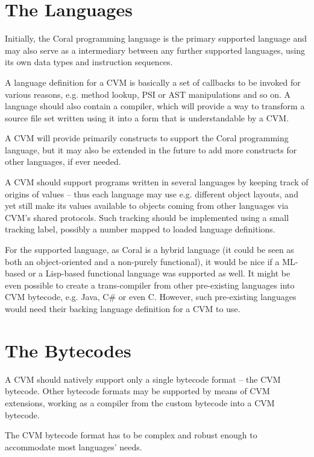 \section{The Languages}

Initially, the Coral programming language is the primary supported language and may also serve as a intermediary between any further supported languages, using its own data types and instruction sequences. 

A language definition for a CVM is basically a set of callbacks to be invoked for various reasons, e.g. method lookup, PSI or AST manipulations and so on. A language should also contain a compiler, which will provide a way to transform a source file set written using it into a form that is understandable by a CVM. 

A CVM will provide primarily constructs to support the Coral programming language, but it may also be extended in the future to add more constructs for other languages, if ever needed. 

A CVM should support programs written in several languages by keeping track of origins of values -- thus each language may use e.g. different object layouts, and yet still make its values available to objects coming from other languages via CVM's shared protocols. Such tracking should be implemented using a small tracking label, possibly a number mapped to loaded language definitions. 

For the supported language, as Coral is a hybrid language (it could be seen as both an object-oriented and a non-purely functional), it would be nice if a ML-based or a Lisp-based functional language was supported as well. It might be even possible to create a trans-compiler from other pre-existing languages into CVM bytecode, e.g. Java, C\# or even C. However, such pre-existing languages would need their backing language definition for a CVM to use. 





\section{The Bytecodes}

A CVM should natively support only a single bytecode format -- the CVM bytecode. Other bytecode formats may be supported by means of CVM extensions, working as a compiler from the custom bytecode into a CVM bytecode. 

The CVM bytecode format has to be complex and robust enough to accommodate most languages' needs. 





